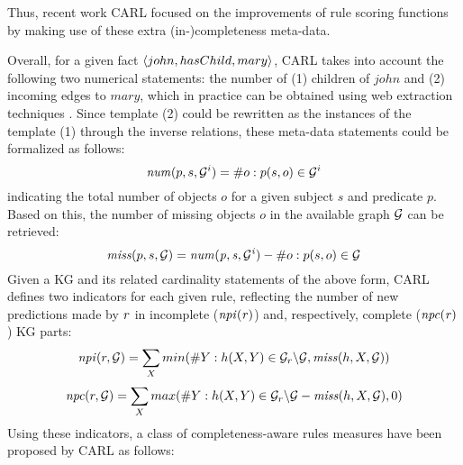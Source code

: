 Thus, recent work CARL \cite{carl} focused on the improvements of rule scoring functions by making use of these extra (in-)completeness meta-data.

Overall, for a given fact $\langle john, hasChild, mary\rangle$, CARL takes into account the following two numerical statements: the number of (1) children of $john$ and (2) incoming edges to $mary$, which in practice can be obtained using web extraction techniques \cite{cardinality-extraction-iswc-2016}. Since template (2) could be rewritten as the instances of the template (1) through the inverse relations, these meta-data statements could be formalized as follows:
\[\mathit{num}(p,s, \mathcal{G}^i) = \# o : p(s,o) \in \mathcal{G}^i\]
indicating the total number of objects $o$ for a given subject $s$ and predicate $p$. Based on this, the number of missing objects $o$ in the available graph $\mathcal{G}$ can be retrieved:
\[\mathit{miss}(p,s,\mathcal{G}) = \mathit{num(p,s,\mathcal{G}^i)} - \#o : p(s,o) \in \mathcal{G}\]
Given a KG and its related cardinality statements of the above form, CARL defines two indicators for each given rule, reflecting the number of new 
predictions made by $\mathit{r}$ in incomplete ($\mathit{npi(r)}$) and, respectively, complete ($\mathit{npc(r)}$) KG parts:
\begin{align*}
\mathit{npi}(r, \mathcal{G}) = \sum_X min(\#Y: h(X,Y)\in \mathcal{G}_r\backslash \mathcal{G}, \mathit{miss}(h,X,\mathcal{G}))
\end{align*}
\vspace{-\topsep}
\vspace{-\topsep}
\begin{align*}
\mathit{npc}(r, \mathcal{G}) = \sum_X max(\#Y: h(X,Y)\in\mathcal{G}_r\backslash \mathcal{G} - \mathit{miss}(h,X,\mathcal{G}), 0)
\end{align*}
Using these indicators, a class of completeness-aware rules measures have been proposed by CARL as follows:
